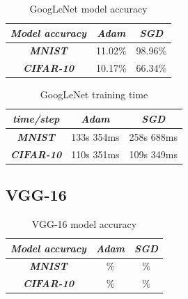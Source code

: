 \documentclass[conference]{IEEEtran}
\begin{document}
\begin{table}[htbp]
    \caption{GoogLeNet model accuracy}
    \begin{center}
    \begin{tabular}{|c|c|c|}
    \cline{1-3} 
    \textit{Model accuracy} & \textbf{\textit{Adam}}& \textbf{\textit{SGD}} \\
    \hline
    \textbf{\textit{MNIST}} & 11.02\% & 98.96\% \\
    \hline
    \textbf{\textit{CIFAR-10}} & 10.17\% & 66.34\% \\
    \cline{1-3} 
    \end{tabular}
    \label{tab: GoogLeNet model accuracy}
    \end{center}
\end{table}

\begin{table}[htbp]
    \caption{GoogLeNet training time}
    \begin{center}
    \begin{tabular}{|c|c|c|}
    \cline{1-3} 
    \textit{time/step} & \textbf{\textit{Adam}}& \textbf{\textit{SGD}} \\
    \hline
    \textbf{\textit{MNIST}} & 133s 354ms & 258s 688ms \\
    \hline
    \textbf{\textit{CIFAR-10}} & 110s 351ms & 109s 349ms \\
    \cline{1-3} 
    \end{tabular}
    \label{tab: GoogLeNet training time}
    \end{center}
\end{table}

\subsection{VGG-16}

\begin{table}[htbp]
    \caption{VGG-16 model accuracy}
    \begin{center}
    \begin{tabular}{|c|c|c|}
    \cline{1-3} 
    \textit{Model accuracy} & \textbf{\textit{Adam}}& \textbf{\textit{SGD}} \\
    \hline
    \textbf{\textit{MNIST}} & \% & \% \\
    \hline
    \textbf{\textit{CIFAR-10}} & \% & \% \\
    \cline{1-3} 
    \end{tabular}
    \label{tab: VGG-16 model accuracy}
    \end{center}
\end{table}
\end{document}
